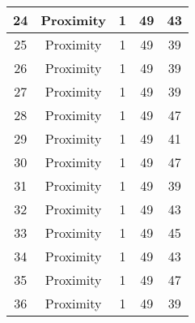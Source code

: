 \documentclass[results.tex]{subfiles}
\begin{document}
\begin{center}
\begin{tabular}{| c || c | c | c | c |}
            \hline
            24                      & Proximity                    & 1                      & 49                      & 43                   \\
            \hline
            25                      & Proximity                    & 1                      & 49                      & 39                   \\
            \hline
            26                      & Proximity                    & 1                      & 49                      & 39                   \\
            \hline
            27                      & Proximity                    & 1                      & 49                      & 39                   \\
            \hline
            28                      & Proximity                    & 1                      & 49                      & 47                   \\
            \hline
            29                      & Proximity                    & 1                      & 49                      & 41                   \\
            \hline
            30                      & Proximity                    & 1                      & 49                      & 47                   \\
            \hline
            31                      & Proximity                    & 1                      & 49                      & 39                   \\
            \hline
            32                      & Proximity                    & 1                      & 49                      & 43                   \\
            \hline
            33                      & Proximity                    & 1                      & 49                      & 45                   \\
            \hline
            34                      & Proximity                    & 1                      & 49                      & 43                   \\
            \hline
            35                      & Proximity                    & 1                      & 49                      & 47                   \\
            \hline
            36                      & Proximity                    & 1                      & 49                      & 39                   \\

\end{tabular}
\end{center}
\end{document}
